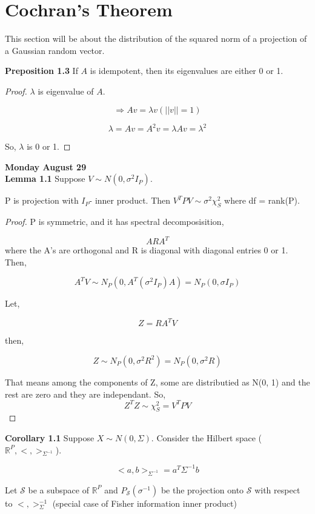 \documentclass[11pt,fleqn]{book} %
\begin{document}
\section{Cochran's Theorem}

This section will be about the distribution of the squared norm of a projection of a Gaussian random vector. 

\textbf{Preposition 1.3} If $A$ is idempotent, then its eigenvalues are either 0 or 1. 

\begin{proof}
	$\lambda$ is eigenvalue of $A$. 

	$$\Rightarrow Av = \lambda v (||v|| = 1)$$ 

	$$ \lambda = Av = A^2v = \lambda Av = \lambda^2$$

	So, $\lambda$ is 0 or 1.
\end{proof}

\textbf{Monday August 29}\\


 \textbf{Lemma 1.1}
 	Suppose $V \sim N(0, \sigma^2 I_P)$. 

 	P is projection with $I_P$- inner product. 
 	Then $V^T PV \sim \sigma^2 \chi^2_S$ where df = rank(P).

 	\begin{proof}
 		P is symmetric, and it has spectral decomposisition, 

 		$$A R A^T $$
 		where the A's are orthogonal and R is diagonal with diagonal entries 0 or 1.\\

 		Then, 

 		$$A^T V \sim N_P (0, A^T (\sigma^2 I_P)A) = N_P (0, \sigma I_P) $$
 		
 		Let, 

 		$$Z = R A^T V$$

 		then,

 		$$Z \sim N_P (0, \sigma^2 R^2) = N_P (0, \sigma^2 R) $$

 		That means among the components of Z, some are distributied as N(0, 1) and the rest are zero and they are independant. So, 
 		$$Z^T Z \sim \chi^2_S = V^T P V $$
  	\end{proof}

  	\textbf{Corollary 1.1} Suppose $X \sim N(0, \Sigma)$. Consider the Hilbert space ($\mathbb{R}^P, <,>_{\Sigma^{-1}}$). 

  	$$<a,b>_{\Sigma^{-1}} = a^T \Sigma^{-1} b$$

  	Let $\mathscr{S}$ be a subspace of $\mathbb{R}^P$ and $P_\mathscr{S}(\sigma^{-1})$ be the projection onto $\mathscr{S}$ with respect to $<,>_\Sigma^{-1}$ (special case of Fisher information inner product)
\end{document}
